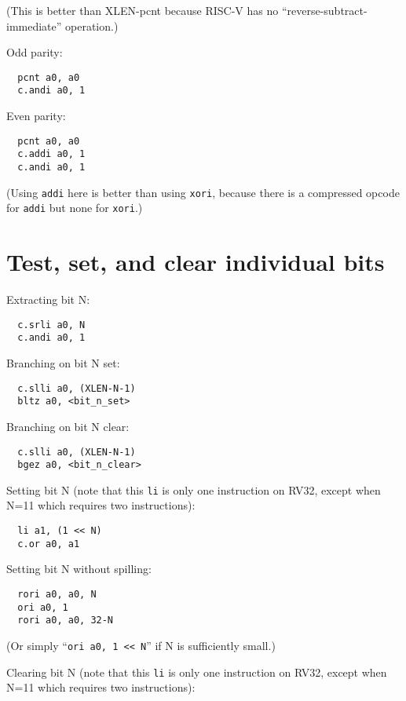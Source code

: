 (This is better than XLEN-pcnt because RISC-V has no ``reverse-subtract-immediate'' operation.)

Odd parity:

\begin{verbatim}
  pcnt a0, a0
  c.andi a0, 1
\end{verbatim}

Even parity:

\begin{verbatim}
  pcnt a0, a0
  c.addi a0, 1
  c.andi a0, 1
\end{verbatim}

(Using {\tt addi} here is better than using {\tt xori}, because there is
a compressed opcode for {\tt addi} but none for {\tt xori}.)

\section{Test, set, and clear individual bits}

Extracting bit N:

\begin{verbatim}
  c.srli a0, N
  c.andi a0, 1
\end{verbatim}

Branching on bit N set:

\begin{verbatim}
  c.slli a0, (XLEN-N-1)
  bltz a0, <bit_n_set>
\end{verbatim}

Branching on bit N clear:

\begin{verbatim}
  c.slli a0, (XLEN-N-1)
  bgez a0, <bit_n_clear>
\end{verbatim}

Setting bit N (note that this {\tt li} is only one instruction on RV32, except when N=11 which requires two instructions):

\begin{verbatim}
  li a1, (1 << N)
  c.or a0, a1
\end{verbatim}

Setting bit N without spilling:

\begin{verbatim}
  rori a0, a0, N
  ori a0, 1
  rori a0, a0, 32-N
\end{verbatim}

(Or simply ``{\tt ori a0, 1 << N}'' if N is sufficiently small.)

Clearing bit N (note that this {\tt li} is only one instruction on RV32, except when N=11 which requires two instructions):

